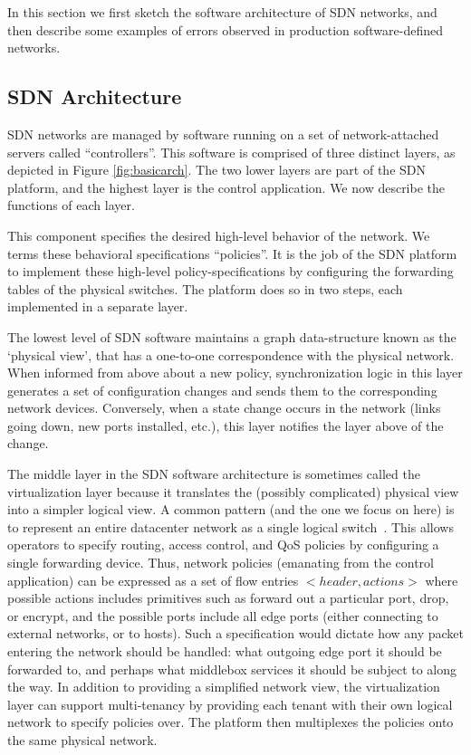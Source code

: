 In this section we first sketch the software architecture of SDN networks, and then describe some examples
of errors observed in production software-defined networks.

\subsection{SDN Architecture}

SDN networks are managed by software running on a set of network-attached servers called ``controllers''. This software is comprised of three distinct layers, as
depicted in Figure \ref{fig:basicarch}. The two lower layers are part of the SDN platform, and the highest layer is the control application. We now describe the functions of each layer.

 This component specifies the desired
high-level behavior of the network. We terms these behavioral specifications ``policies''. It is the job of the SDN platform to implement these high-level policy-specifications by configuring the forwarding tables of the physical switches. The platform does so in two steps, each implemented in a separate layer.

 The lowest level of SDN software maintains a graph data-structure known as
the `physical view', that has a one-to-one correspondence with the physical
network. When informed from above about a new policy,
synchronization logic in this layer generates a set of configuration changes and sends them to the
corresponding network devices. Conversely, when a state change
occurs in the network (links going down, new ports installed, etc.), this layer notifies the layer above of the change.

 The middle layer in the SDN software architecture is sometimes called the virtualization layer because it translates the (possibly complicated) physical view into a simpler logical view. A common pattern (and the one we focus on here) is to represent an entire
datacenter network as a single logical
switch~\cite{Casado:2010:VNF:1921151.1921162}. This allows operators
to specify routing, access control, and QoS policies by configuring a single forwarding
device. Thus, network policies (emanating from the control application) can be
expressed as a set of flow entries $<header, actions>$ where possible actions
includes primitives such as forward out a particular port, drop, or encrypt,
and the possible ports include all edge ports (either connecting to external
networks, or to hosts). Such a specification would dictate how any packet
entering the network should be handled: \ie{} what outgoing edge port it should be forwarded to, and perhaps what middlebox services it should be subject to along the way.   
In addition to providing a simplified network view, the virtualization layer
can support multi-tenancy by providing each tenant with their own logical
network to specify policies over. The platform then multiplexes the policies onto the same physical network.

